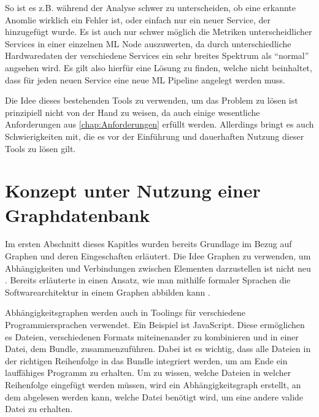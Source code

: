\documentclass[
	12pt,
	BCOR=5mm,
	DIV=12,
	headinclude=on,
	footinclude=off,
	parskip=half,
	bibliography=totoc,
	listof=entryprefix,
	toc=listof,
	numbers=noenddot,
	plainfootsepline
]{scrreprt}
\begin{document}
So ist es z.B. während der Analyse schwer zu unterscheiden, ob eine erkannte Anomlie wirklich ein Fehler ist, oder einfach nur ein neuer Service, der hinzugefügt wurde. Es ist auch nur schwer möglich die Metriken unterscheidlicher Services in einer einzelnen \ac{ML} Node auszuwerten, da durch unterschiedliche Hardwaredaten der verschiedene Services ein sehr breites Spektrum als \enquote{normal} angsehen wird. Es gilt also hierfür eine Lösung zu finden, welche nicht beinhaltet, dass für jeden neuen Service eine neue \ac{ML} Pipeline angelegt werden muss.

Die Idee dieses bestehenden Tools zu verwenden, um das Problem zu lösen ist prinzipiell nicht von der Hand zu weisen, da auch einige wesentliche Anforderungen aus \vref{chap:Anforderungen} erfüllt werden. Allerdings bringt es auch Schwierigkeiten mit, die es vor der Einführung und dauerhaften Nutzung dieser Tools zu lösen gilt.

\section{Konzept unter Nutzung einer Graphdatenbank}

Im ersten Abschnitt dieses Kapitles wurden bereits Grundlage im Bezug auf Graphen und deren Eingeschaften erläutert. Die Idee Graphen zu verwenden, um Abhängigkeiten und Verbindungen zwischen Elementen darzustellen ist nicht neu \autocite{Ren2018}. Bereits \citeyear{Metayer1998} erläuterte \citeauthor{Metayer1998} in  einen Ansatz, wie man mithilfe formaler Sprachen die Softwarearchitektur in einem Graphen abbilden kann \autocite{Metayer1998}.

\begin{example}[Abhängigkeitsgraphen]
	Abhängigkeitsgraphen werden auch in Toolings für verschiedene Programmiersprachen verwendet. Ein Beispiel ist JavaScript. Diese ermöglichen es Dateien, verschiedenen Formats miteinenander zu kombinieren und in einer Datei, dem Bundle, zusammenzuführen. Dabei ist es wichtig, dass alle Dateien in der richtigen Reihenfolge in das Bundle integriert werden, um am Ende ein lauffähiges Programm zu erhalten. Um zu wissen, welche Dateien in welcher Reihenfolge eingefügt werden müssen, wird ein Abhängigkeitsgraph erstellt, an dem abgelesen werden kann, welche Datei benötigt wird, um eine andere valide Datei zu erhalten.
\end{example}
\end{document}

